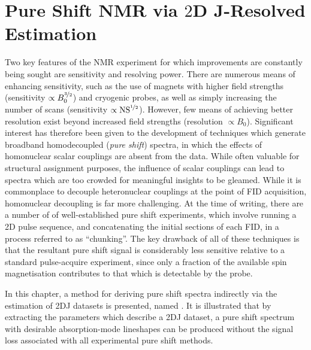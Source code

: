 \chapter{Pure Shift NMR via $2$D J-Resolved Estimation}
\label{chap:cupid}
Two key features of the \ac{NMR} experiment for which improvements are
constantly being sought are sensitivity and resolving power. There are numerous
means of enhancing sensitivity, such as the use of magnets with higher field
strengths\cite{Maeda2019} (sensitivity $\propto B_0^{\nicefrac{3}{2}}$) and
cryogenic probes\cite{Kovacs2020}, as well as simply
increasing the number of scans (sensitivity $\propto
\operatorname{NS}^{\nicefrac{1}{2}}$).
However, few means of achieving better resolution exist beyond increased field
strengths (resolution $\propto B_0$). Significant interest has therefore been
given to the development of techniques which generate broadband homodecoupled
(\emph{pure shift}) spectra, in which the effects of homonuclear scalar
couplings are absent from the data. While often valuable for structural
assignment purposes, the influence of scalar couplings can lead to spectra
which are too crowded for meaningful insights to be gleamed. While it is
commonplace to decouple heteronuclear couplings at the point of \ac{FID}
acquisition\cite{Shaka1983a, Shaka1983b,Shaka1985}, homonuclear decoupling is
far more challenging. At the time of writing, there are a number of of
well-established pure shift experiments, which involve running a \ac{2D} pulse
sequence, and concatenating the initial sections of each \ac{FID}, in a process
referred to as ``chunking''\cite{Meyer2013,Adams2014,Zangger2015}. The key
drawback of all of these techniques is that the resultant pure shift signal is
considerably less sensitive relative to a standard pulse-acquire experiment,
since only a fraction of the available spin magnetisation contributes to that
which is detectable by the probe.

In this chapter, a method for deriving pure shift spectra indirectly via the
estimation of \ac{2DJ} datasets is presented, named . It is
illustrated that by extracting the parameters which describe a \ac{2DJ}
dataset, a pure shift spectrum with desirable absorption-mode lineshapes can be
produced without the signal loss associated with all experimental pure shift
methods.





